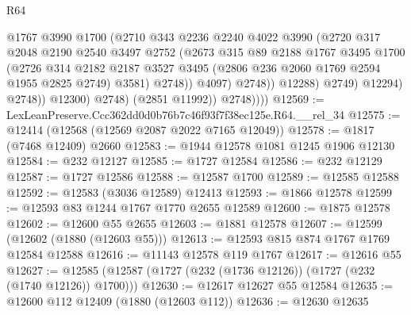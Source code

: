 \begin{lexlean}{R64}
\begin{coremodule}
                                @1767
                                @3990
                                @1700
                                (@2710
                                  @343
                                  @2236
                                  @2240
                                  @4022
                                  @3990
                                  (@2720
                                    @317
                                    @2048
                                    @2190
                                    @2540
                                    @3497
                                    @2752
                                    (@2673
                                      @315
                                      @89
                                      @2188
                                      @1767
                                      @3495
                                      @1700
                                      (@2726
                                        @314
                                        @2182
                                        @2187
                                        @3527
                                        @3495
                                        (@2806 @236 @2060 @1769 @2594 @1955 @2825 @2749)
                                        @3581)
                                      @2748))
                                  @4097)
                                @2748))
                            @12288)
                          @2749)
                        @12294)
                      @2748))
                  @12300)
                @2748)
              (@2851 @11992))
            @2748))))
@12569 := LexLeanPreserve.Ccc362dd0d0b76b7c46f93f7f38ec125e.R64.__rel_34
@12575 := @12414 (@12568 (@12569 @2087 @2022 @7165 @12049))
@12578 := @1817 (@7468 @12409) @2660
@12583 := @1944 @12578 @1081 @1245 @1906 @12130
@12584 := @232 @12127
@12585 := @1727 @12584
@12586 := @232 @12129
@12587 := @1727 @12586
@12588 := @12587 @1700
@12589 := @12585 @12588
@12592 := @12583 (@3036 @12589) @12413
@12593 := @1866 @12578
@12599 := @12593 @83 @1244 @1767 @1770 @2655 @12589
@12600 := @1875 @12578
@12602 := @12600 @55 @2655
@12603 := @1881 @12578
@12607 := @12599 (@12602 (@1880 (@12603 @55)))
@12613 := @12593 @815 @874 @1767 @1769 @12584 @12588
@12616 := @11143 @12578 @119 @1767
@12617 := @12616 @55
@12627 := @12585 (@12587 (@1727 (@232 (@1736 @12126)) (@1727 (@232 (@1740 @12126)) @1700)))
@12630 := @12617 @12627 @55 @12584
@12635 := @12600 @112 @12409 (@1880 (@12603 @112))
@12636 := @12630 @12635

\end{coremodule}
\end{lexlean}
